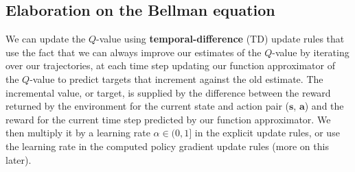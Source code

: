 \documentclass{article}
\begin{document}
\subsection{Elaboration on the Bellman equation}

We can update the $Q$-value using \textbf{temporal-difference} (TD) update rules that use the fact that we can always improve our estimates of the $Q$-value by iterating over our trajectories, at each time step updating our function approximator of the $Q$-value to predict targets that increment against the old estimate. The incremental value, or target, is supplied by the difference between the  reward returned by the environment for the current state and action pair ($\mathbf{s}$, $\mathbf{a}$) and the reward for the current time step predicted by our function approximator. We then multiply it by a learning rate $\alpha\in(0,1]$ in the explicit update rules, or use the learning rate in the computed policy gradient update rules (more on this later). 
\end{document}
